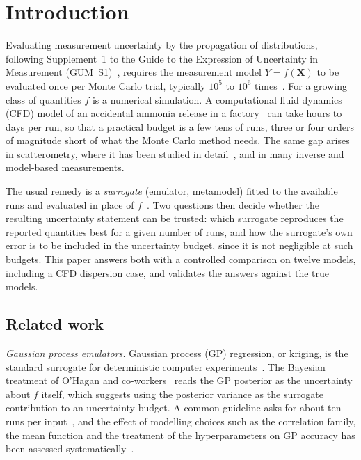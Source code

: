 
\section{Introduction}
Evaluating measurement uncertainty by the propagation of distributions,
following Supplement~1 to the Guide to the Expression of Uncertainty in
Measurement (GUM~S1)~\cite{jcgm100,jcgm101}, requires the measurement model
$Y=f(\mathbf X)$ to be evaluated once per Monte Carlo trial, typically
$10^5$ to $10^6$ times~\cite{cox2006,harris2014}. For a growing class of
quantities $f$ is a numerical simulation. A computational fluid dynamics
(CFD) model of an accidental ammonia release in a factory~\cite{tan2017}
can take hours to days per run, so that a practical budget is a few tens of
runs, three or four orders of magnitude short of what the Monte Carlo
method needs. The same gap arises in scatterometry, where it has been
studied in detail~\cite{heidenreich2017}, and in many inverse and
model-based measurements.

The usual remedy is a \emph{surrogate} (emulator, metamodel) fitted to the
available runs and evaluated in place of $f$~\cite{ohagan2006,wang2022}.
Two questions then decide whether the resulting uncertainty statement can
be trusted: which surrogate reproduces the reported quantities best for a
given number of runs, and how the surrogate's own error is to be included
in the uncertainty budget, since it is not negligible at such budgets.
This paper answers both with a controlled comparison on twelve models,
including a CFD dispersion case, and validates the answers against the
true models.

\subsection{Related work}
\emph{Gaussian process emulators.} Gaussian process (GP) regression, or
kriging, is the standard surrogate for deterministic computer
experiments~\cite{sacks1989,rw2006}. The Bayesian treatment of O'Hagan and
co-workers~\cite{ohagan2006,kennedy2001} reads the GP posterior as the
uncertainty about $f$ itself, which suggests using the posterior variance
as the surrogate contribution to an uncertainty budget. A common guideline
asks for about ten runs per input~\cite{loeppky2009}, and the effect of
modelling choices such as the correlation family, the mean function and
the treatment of the hyperparameters on GP accuracy has been assessed
systematically~\cite{chen2016}.

